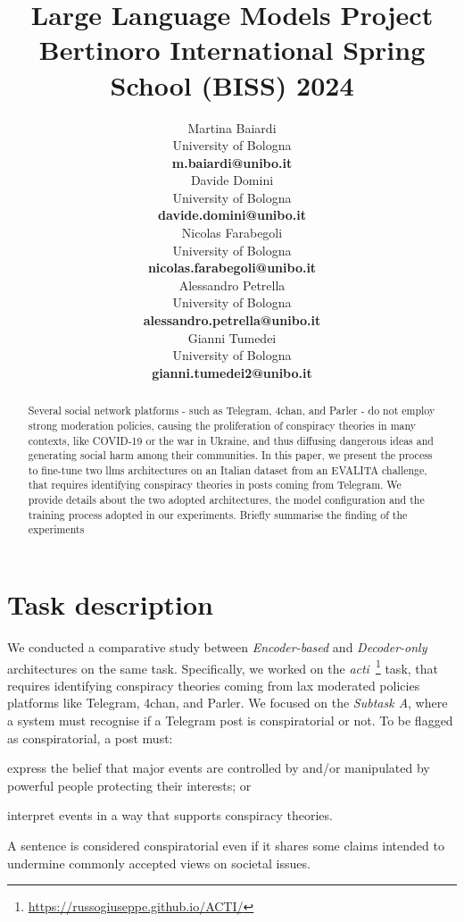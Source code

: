 \documentclass[11pt]{article}
\title{Large Language Models Project \\
Bertinoro International Spring School (BISS) 2024}
\author{
  Martina Baiardi \\
  University of Bologna \\
  {\bf m.baiardi@unibo.it} \\ \And
  Davide Domini \\
  University of Bologna \\
  {\bf davide.domini@unibo.it} \\  \And
  Nicolas Farabegoli \\
  University of Bologna \\
  {\bf nicolas.farabegoli@unibo.it} \\  \AND
  Alessandro Petrella\\
  University of Bologna \\
  {\bf alessandro.petrella@unibo.it} \\ \And
  Gianni Tumedei \\
  University of Bologna \\
  {\bf gianni.tumedei2@unibo.it}
}
\newcommand{\meta}[1]{{\color{blue}#1}}
\begin{document}
\maketitle

\begin{abstract}
Several social network platforms - such as Telegram, 4chan, and Parler - do not employ strong moderation
policies, causing the proliferation of conspiracy theories in many contexts, like COVID-19 or the war
in Ukraine, and thus diffusing dangerous ideas and generating social harm among their communities.
%
In this paper, we present the process to fine-tune two \acp{llm} architectures
on an Italian dataset from an EVALITA challenge, that requires identifying
conspiracy theories in posts coming from Telegram.
%
We provide details about the two adopted architectures, the model configuration and the training
process adopted in our experiments.
%
\meta{Briefly summarise the finding of the experiments}
\end{abstract}

\section{Task description}\label{sec:task-description}
We conducted a comparative study between \emph{Encoder-based} and \emph{Decoder-only} architectures
on the same task.
%
Specifically, we worked on the \emph{\ac{acti}}~\footnote{\url{https://russogiuseppe.github.io/ACTI/}}
task, that requires identifying conspiracy theories coming from lax moderated policies platforms like
Telegram, 4chan, and Parler.
%
We focused on the \emph{Subtask A}, where a system must recognise if a Telegram post is conspiratorial
or not.
%
To be flagged as conspiratorial, a post must:
\begin{enumerate*}[label=(\roman{*})]
  \item express the belief that major events are controlled by and/or manipulated by powerful people protecting their interests; or
  \item interpret events in a way that supports conspiracy theories.
\end{enumerate*}
A sentence is considered conspiratorial even if it shares some claims intended to undermine commonly accepted views on societal issues.
\end{document}
